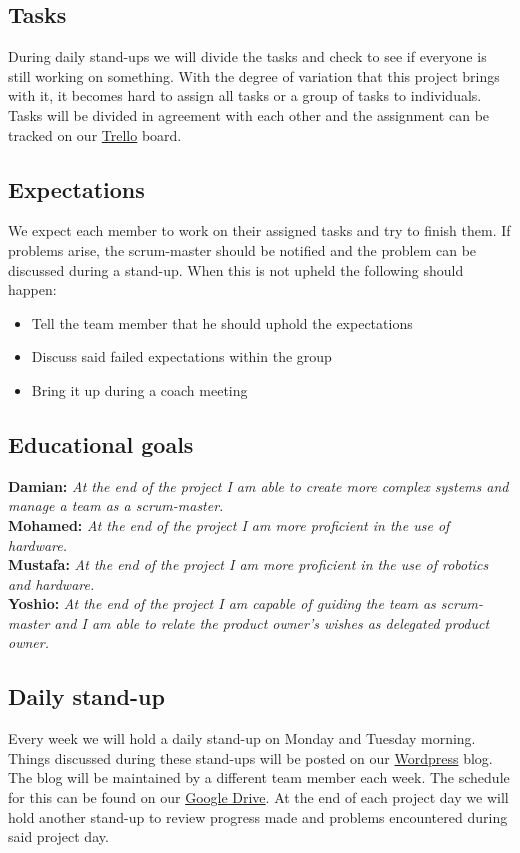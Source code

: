 \documentclass[12pt]{article}
\begin{document}
	\subsection{Tasks}
	During daily stand-ups we will divide the tasks and check to see if everyone is still working on something. With the degree of variation that this project brings with it, it becomes hard to assign all tasks or a group of tasks to individuals. Tasks will be divided in agreement with each other and the assignment can be tracked on our \href{https://trello.com/b/VLCdhQAQ/sprint-3}{Trello} board.
	\subsection{Expectations}
	We expect each member to work on their assigned tasks and try to finish them. If problems arise, the scrum-master should be notified and the problem can be discussed during a stand-up. When this is not upheld the following should happen:
	\begin{itemize}
		\item Tell the team member that he should uphold the expectations
		\item Discuss said failed expectations within the group
		\item Bring it up during a coach meeting
	\end{itemize}
	\subsection{Educational goals}
	\textbf{Damian: }\emph{At the end of the project I am able to create more complex systems and manage a team as a scrum-master.}\\
	\textbf{Mohamed: }\emph{At the end of the project I am more proficient in the use of hardware.}\\
	\textbf{Mustafa: }\emph{At the end of the project I am more proficient in the use of robotics and hardware.}\\
	\textbf{Yoshio: }\emph{At the end of the project I am capable of guiding the team as scrum-master and I am able to relate the product owner's wishes as delegated product owner.}
	\subsection{Daily stand-up}
	Every week we will hold a daily stand-up on Monday and Tuesday morning. Things discussed during these stand-ups will be posted on our \href{https://metabotsrow.wordpress.com/}{Wordpress} blog. The blog will be maintained by a different team member each week. The schedule for this can be found on our \href{https://drive.google.com/drive/folders/1IJEu7igVdK12MzVx3jkXZMvB5HUXFuYZ?usp=sharing}{Google Drive}. At the end of each project day we will hold another stand-up to review progress made and problems encountered during said project day.
\end{document}
